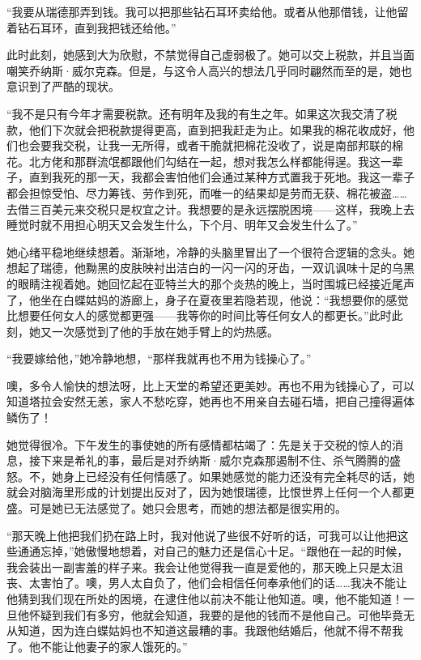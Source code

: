 \par “我要从瑞德那弄到钱。我可以把那些钻石耳环卖给他。或者从他那借钱，让他留着钻石耳环，直到我把钱还给他。”
\par 此时此刻，她感到大为欣慰，不禁觉得自己虚弱极了。她可以交上税款，并且当面嘲笑乔纳斯·威尔克森。但是，与这令人高兴的想法几乎同时翩然而至的是，她也意识到了严酷的现状。
\par “我不是只有今年才需要税款。还有明年及我的有生之年。如果这次我交清了税款，他们下次就会把税款提得更高，直到把我赶走为止。如果我的棉花收成好，他们也会要我交税，让我一无所得，或者干脆就把棉花没收了，说是南部邦联的棉花。北方佬和那群流氓都跟他们勾结在一起，想对我怎么样都能得逞。我这一辈子，直到我死的那一天，我都会害怕他们会通过某种方式置我于死地。我这一辈子都会担惊受怕、尽力筹钱、劳作到死，而唯一的结果却是劳而无获、棉花被盗……去借三百美元来交税只是权宜之计。我想要的是永远摆脱困境——这样，我晚上去睡觉时就不用担心明天又会发生什么，下个月、明年又会发生什么了。”
\par 她心绪平稳地继续想着。渐渐地，冷静的头脑里冒出了一个很符合逻辑的念头。她想起了瑞德，他黝黑的皮肤映衬出洁白的一闪一闪的牙齿，一双讥讽味十足的乌黑的眼睛注视着她。她回忆起在亚特兰大的那个炎热的晚上，当时围城已经接近尾声了，他坐在白蝶姑妈的游廊上，身子在夏夜里若隐若现，他说：“我想要你的感觉比想要任何女人的感觉都更强——我等你的时间比等任何女人的都更长。”此时此刻，她又一次感觉到了他的手放在她手臂上的灼热感。
\par “我要嫁给他，”她冷静地想，“那样我就再也不用为钱操心了。”
\par 噢，多令人愉快的想法呀，比上天堂的希望还更美妙。再也不用为钱操心了，可以知道塔拉会安然无恙，家人不愁吃穿，她再也不用亲自去碰石墙，把自己撞得遍体鳞伤了！
\par 她觉得很冷。下午发生的事使她的所有感情都枯竭了：先是关于交税的惊人的消息，接下来是希礼的事，最后是对乔纳斯·威尔克森那遏制不住、杀气腾腾的盛怒。不，她身上已经没有任何情感了。如果她感觉的能力还没有完全耗尽的话，她就会对脑海里形成的计划提出反对了，因为她恨瑞德，比恨世界上任何一个人都更盛。可是她已无法感觉了。她只会思考，而她的想法都是很实用的。
\par “那天晚上他把我们扔在路上时，我对他说了些很不好听的话，可我可以让他把这些通通忘掉，”她傲慢地想着，对自己的魅力还是信心十足。“跟他在一起的时候，我会装出一副害羞的样子来。我会让他觉得我一直是爱他的，那天晚上只是太沮丧、太害怕了。噢，男人太自负了，他们会相信任何奉承他们的话……我决不能让他猜到我们现在所处的困境，在逮住他以前决不能让他知道。噢，他不能知道！一旦他怀疑到我们有多穷，他就会知道，我要的是他的钱而不是他自己。可他毕竟无从知道，因为连白蝶姑妈也不知道这最糟的事。我跟他结婚后，他就不得不帮我了。他不能让他妻子的家人饿死的。”
